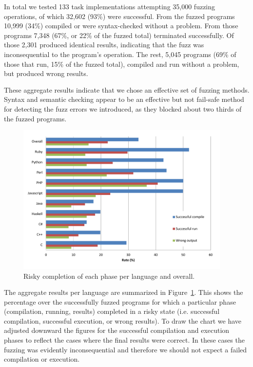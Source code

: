 \documentclass[10pt]{sigplanconf}
\begin{document}
In total we tested
133 task implementations
attempting 35,000 fuzzing operations,
of which 32,602 (93\%) were successful.
From the fuzzed programs 10,999 (34\%)
compiled or were syntax-checked without a problem.
From those programs 7,348 (67\%, or 22\% of the fuzzed total) terminated successfully.
Of those 2,301 produced identical results, indicating that the fuzz was
inconsequential to the program's operation.
The rest, 5,045 programs (69\% of those that run, 15\% of the fuzzed total),
compiled and run without a problem, but produced wrong results.

These aggregate results indicate that we chose an effective set
of fuzzing methods.
Syntax and semantic checking appear to be an effective but not
fail-safe method for detecting the fuzz errors we introduced,
as they blocked about two thirds of the fuzzed programs.

\begin{figure}
        \begin{center}
                \includegraphics[width=0.95\textwidth]{chart}
        \end{center}
        \caption{Risky completion of each phase per language and overall.}
        \label{fig:results}
\end{figure}

The aggregate results per language are summarized in Figure~\ref{fig:results}.
This shows the percentage over the successfully fuzzed programs
for which a particular phase (compilation, running, results)
completed in a risky state
(i.e. successful compilation, successful execution, or wrong results).
To draw the chart we have adjusted downward the figures for
the successful compilation and execution phases
to reflect the cases where the final results were correct.
In these cases the fuzzing was evidently inconsequential and therefore we
should not expect a failed compilation or execution.
\end{document}

